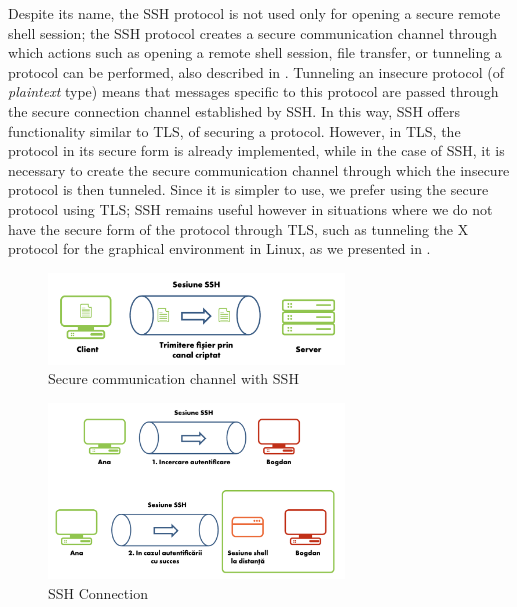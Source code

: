 Despite its name, the SSH protocol is not used only for opening a secure remote shell session;
the SSH protocol creates a secure communication channel through which actions such as opening a remote shell session, file transfer, or tunneling a protocol can be performed, also described in .
Tunneling an insecure protocol (of \textit{plaintext} type) means that messages specific to this protocol are passed through the secure connection channel established by SSH.
In this way, SSH offers functionality similar to TLS, of securing a protocol.
However, in TLS, the protocol in its secure form is already implemented, while in the case of SSH, it is necessary to create the secure communication channel through which the insecure protocol is then tunneled.
Since it is simpler to use, we prefer using the secure protocol using TLS;
SSH remains useful however in situations where we do not have the secure form of the protocol through TLS, such as tunneling the X protocol for the graphical environment in Linux, as we presented in .

\begin{figure}[htbp]
  \centering
  \def\svgwidth{\columnwidth}
  \includegraphics[width=0.7\textwidth]{chapters/12-auth/img/ssh-channel.svg.pdf}
  \caption{Secure communication channel with SSH}
  \label{fig:sec:ssh-channel}
\end{figure}

\begin{figure}[htbp]
  \centering
  \def\svgwidth{\columnwidth}
  \includegraphics[width=0.7\textwidth]{chapters/12-auth/img/ssh-session.svg.pdf}
  \caption{SSH Connection}
  \label{fig:sec:ssh-session}
\end{figure}

